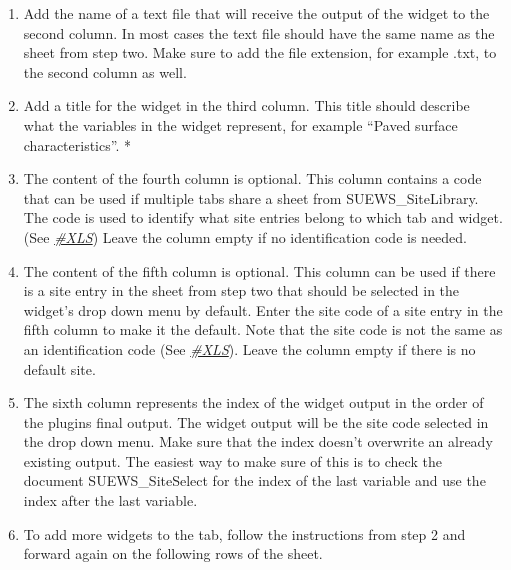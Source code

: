 \documentclass[letterpaper,10pt,english]{sphinxmanual}
\begin{document}
\begin{itemize}
\begin{description}
\begin{enumerate}
\item {} 
Add the name of a text file that will receive the output of the widget to the second column. In most cases the text file should have the same name as the sheet from step two. Make sure to add the file extension, for example .txt, to the second column as well.

\item {} 
Add a title for the widget in the third column. This title should describe what the variables in the widget represent, for example “Paved surface characteristics”.   *

\item {} 
The content of the fourth column is optional. This column contains a code that can be used if multiple tabs share a sheet from SUEWS\_SiteLibrary. The code is used to identify what site entries belong to which tab and widget. (See {\hyperref[\detokenize{DevelopmentGuidelines:XLS}]{\emph{\#XLS}}}) Leave the column empty if no identification code is needed.

\item {} 
The content of the fifth column is optional. This column can be used if there is a site entry in the sheet from step two that should be selected in the widget’s drop down menu by default. Enter the site code of a site entry in the fifth column to make it the default. Note that the site code is not the same as an identification code (See {\hyperref[\detokenize{DevelopmentGuidelines:XLS}]{\emph{\#XLS}}}). Leave the column empty if there is no default site.

\item {} 
The sixth column represents the index of the widget output in the order of the plugins final output. The widget output will be the site code selected in the drop down menu. Make sure that the index doesn’t overwrite an already existing output. The easiest way to make sure of this is to check the document SUEWS\_SiteSelect for the index of the last variable and use the index after the last variable.

\item {} 
To add more widgets to the tab, follow the instructions from step 2 and forward again on the following rows of the sheet.

\end{enumerate}

\end{description}


\end{itemize}
\end{document}
